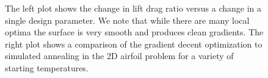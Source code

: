 \documentclass{article} %
\begin{document}
\begin{figure}[h]
\begin{center}
\end{center}
\label{boundary_space_explore}
\caption{The left plot shows the change in lift drag ratio versus a change in a single design parameter. We note that while there are many local optima the surface is very smooth and produces clean gradients. The right plot shows a comparison of the gradient decent optimization to simulated annealing in the 2D airfoil problem for a variety of starting temperatures.}
\end{figure}
\end{document}
